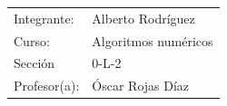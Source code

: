 \documentclass[12pt,letterpaper]{article}
\begin{document}
	\vspace*{6.25cm}
	\begin{flushright}
		\begin{tabular}[t]{l l}
			Integrante: &Alberto Rodríguez\\			
			Curso: &Algoritmos numéricos\\
			Sección &0-L-2\\
			Profesor(a): &Óscar Rojas Díaz

		\end{tabular}
	\end{flushright}
	\begin{center}
		\vspace{1.5cm}
		\Today
	\end{center}

\newpage
\tableofcontents
\thispagestyle{empty}

\newpage
\listoffigures
\thispagestyle{empty}

\newpage
\listoftables
\thispagestyle{empty}

\newpage
\renewcommand{\thepage}{\arabic{page}}
\setcounter{page}{1}






\end{document}
